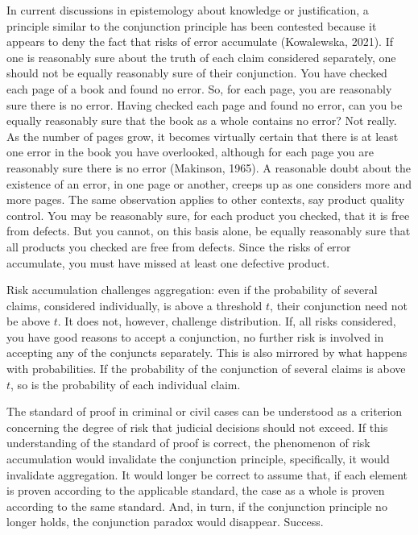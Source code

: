 \documentclass[
  10pt,
  dvipsnames,enabledeprecatedfontcommands]{scrartcl}
\newcommand{\mar}[1]{\todo[color=blue!40]{#1}}
\begin{document}
In current discussions in epistemology about knowledge or justification,
a principle similar to the conjunction principle has been contested
because it appears to deny the fact that risks of error accumulate
(Kowalewska, 2021). If one is reasonably sure about the truth of each
claim considered separately, one should not be equally reasonably sure
of their conjunction. You have checked each page of a book and found no
error. So, for each page, you are reasonably sure there is no error.
Having checked each page and found no error, can you be equally
reasonably sure that the book as a whole contains no error? Not really.
As the number of pages grow, it becomes virtually certain that there is
at least one error in the book you have overlooked, although for each
page you are reasonably sure there is no error (Makinson, 1965). A
reasonable doubt about the existence of an error, in one page or
another, creeps up as one considers more and more pages. The same
observation applies to other contexts, say product quality control. You
may be reasonably sure, for each product you checked, that it is free
from defects. But you cannot, on this basis alone, be equally reasonably
sure that all products you checked are free from defects. Since the
risks of error accumulate, you must have missed at least one defective
product.

Risk accumulation challenges aggregation: even if the probability of
several claims, considered individually, is above a threshold \(t\),
their conjunction need not be above \(t\). It does not, however,
challenge distribution. If, all risks considered, you have good reasons
to accept a conjunction, no further risk is involved in accepting any of
the conjuncts separately. This is also mirrored by what happens with
probabilities. If the probability of the conjunction of several claims
is above \(t\), so is the probability of each individual claim.
\mar{R: What's our take on risk accummulation?}

The standard of proof in criminal or civil cases can be understood as a
criterion concerning the degree of risk that judicial decisions should
not exceed. If this understanding of the standard of proof is correct,
the phenomenon of risk accumulation would invalidate the conjunction
principle, specifically, it would invalidate aggregation. It would
longer be correct to assume that, if each element is proven according to
the applicable standard, the case as a whole is proven according to the
same standard. And, in turn, if the conjunction principle no longer
holds, the conjunction paradox would disappear. Success.
\end{document}

